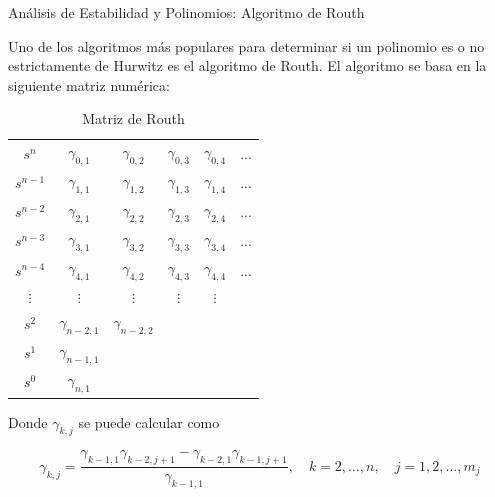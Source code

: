 \documentclass{beamer}
\begin{document}
\begin{frame}{Análisis de Estabilidad y Polinomios: Algoritmo de Routh}
\begin{justify}

{\footnotesize
Uno de los algoritmos más populares para determinar si un polinomio es o no estrictamente de Hurwitz es el algoritmo de Routh. El algoritmo se basa en la siguiente matriz numérica:



\begin{table}[t]
   

\begin{center}
\begin{tabular}{c|ccccc}
$s^n$ & $\gamma_{0,1}$ & $\gamma_{0,2}$ & $\gamma_{0,3}$ & $\gamma_{0,4}$ & ...\\ 
$s^{n-1}$ & $\gamma_{1,1}$ & $\gamma_{1,2}$ & $\gamma_{1,3}$ & $\gamma_{1,4}$ & ... \\
$s^{n-2}$ & $\gamma_{2,1}$ & $\gamma_{2,2}$ & $\gamma_{2,3}$ & $\gamma_{2,4}$ & ...\\
$s^{n-3}$ & $\gamma_{3,1}$ & $\gamma_{3,2}$ & $\gamma_{3,3}$ & $\gamma_{3,4}$ & ...\\
$s^{n-4}$ & $\gamma_{4,1}$ & $\gamma_{4,2}$ & $\gamma_{4,3}$ & $\gamma_{4,4}$ & ...\\
$\vdots$ & $\vdots$ & $\vdots$ & $\vdots$ & $\vdots$\\
$s^{2}$ & $\gamma_{n-2,1}$ & $\gamma_{n-2,2}$\\
$s^{1}$ & $\gamma_{n-1,1}$ \\
$s^{0}$ & $\gamma_{n,1}$
\end{tabular}
\caption{Matriz de Routh}
\label{matriz Routh}

\end{center}
\end{table}

 Donde $\gamma_{k,j}$ se puede calcular como

\begin{equation}
\gamma_{k,j} = \frac{\gamma_{k-1,1} \gamma_{k-2,j+1} - \gamma_{k-2,1} \gamma_{k-1,j+1}}{\gamma_{k-1,1}}, \quad k = 2, \dots, n, \quad j = 1, 2, \dots, m_j
\end{equation}
}
 
\end{justify}
\end{frame}
\end{document}
